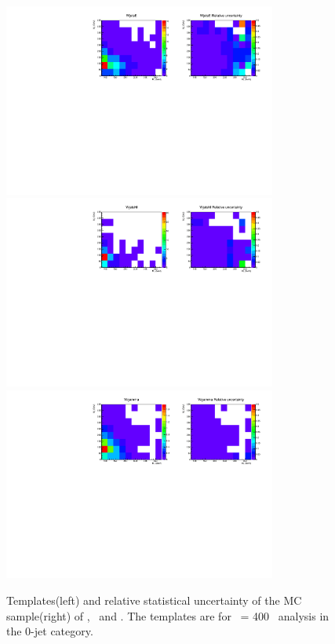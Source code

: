 \begin{figure}[htp]
\centering
\includegraphics[width=0.8\textwidth]{figures/2dtemplate_WjetsE_mH400_0j.pdf}
\includegraphics[width=0.8\textwidth]{figures/2dtemplate_WjetsM_mH400_0j.pdf}
\includegraphics[width=0.8\textwidth]{figures/2dtemplate_Wgamma_mH400_0j.pdf}
\caption{Templates(left) and relative statistical uncertainty of the MC sample(right) 
of \WjetsE, \WjetsM\ and \wgamma. 
The templates are for \mHi\ = 400 \GeV\ analysis in the 0-jet category.}
\label{fig:2dtemplate_400_0j_3}
\end{figure}

